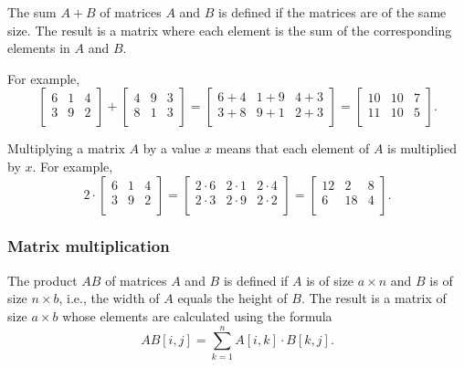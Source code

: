 The sum $A+B$ of matrices $A$ and $B$
is defined if the matrices are of the same size.
The result is a matrix where each element
is the sum of the corresponding elements
in $A$ and $B$.

For example,
\[
 \begin{bmatrix}
  6 & 1 & 4 \\
  3 & 9 & 2 \\
 \end{bmatrix}
+
 \begin{bmatrix}
  4 & 9 & 3 \\
  8 & 1 & 3 \\
 \end{bmatrix}
=
 \begin{bmatrix}
  6+4 & 1+9 & 4+3 \\
  3+8 & 9+1 & 2+3 \\
 \end{bmatrix}
=
 \begin{bmatrix}
  10 & 10 & 7 \\
  11 & 10 & 5 \\
 \end{bmatrix}.
\]

Multiplying a matrix $A$ by a value $x$ means
that each element of $A$ is multiplied by $x$.
For example,
\[
 2 \cdot \begin{bmatrix}
  6 & 1 & 4 \\
  3 & 9 & 2 \\
 \end{bmatrix}
=
 \begin{bmatrix}
  2 \cdot 6 & 2\cdot1 & 2\cdot4 \\
  2\cdot3 & 2\cdot9 & 2\cdot2 \\
 \end{bmatrix}
=
 \begin{bmatrix}
  12 & 2 & 8 \\
  6 & 18 & 4 \\
 \end{bmatrix}.
\]

\subsubsection{Matrix multiplication}


The product $AB$ of matrices $A$ and $B$
is defined if $A$ is of size $a \times n$
and $B$ is of size $n \times b$, i.e.,
the width of $A$ equals the height of $B$.
The result is a matrix of size $a \times b$
whose elements are calculated using the formula
\[
AB[i,j] = \sum_{k=1}^n A[i,k] \cdot B[k,j].
\]

